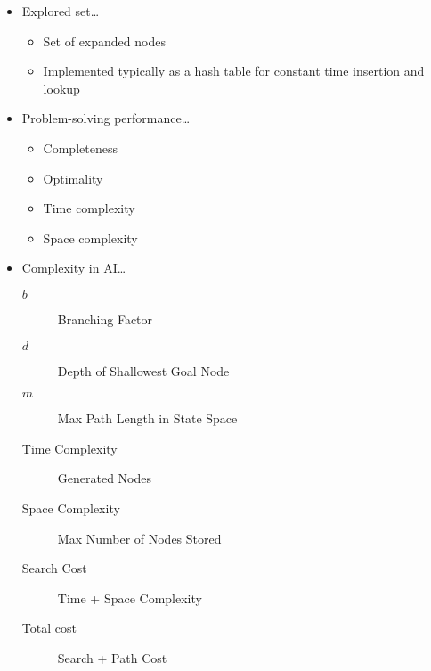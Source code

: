 \begin{itemize}
        \item Explored set\ldots
            \begin{itemize}
                \item Set of expanded nodes
                \item Implemented typically as a hash table for constant time insertion and lookup
            \end{itemize}

        \item Problem-solving performance\ldots
            \begin{itemize}
                \item Completeness
                \item Optimality
                \item Time complexity
                \item Space complexity
            \end{itemize}

        \item Complexity in AI\ldots
            \begin{description}
                \item[$b$] Branching Factor
                \item[$d$] Depth of Shallowest Goal Node
                \item[$m$] Max Path Length in State Space
                \item[Time Complexity] Generated Nodes
                \item[Space Complexity] Max Number of Nodes Stored
                \item[Search Cost] Time + Space Complexity
                \item[Total cost] Search + Path Cost
            \end{description}
\end{itemize}
